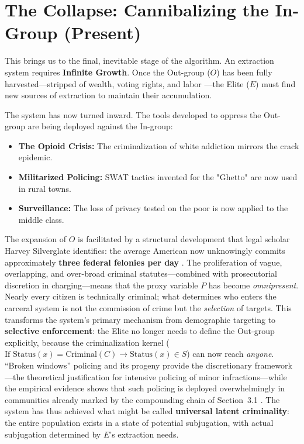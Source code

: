 \documentclass[12pt,openany]{book}
\begin{document}
\section{The Collapse: Cannibalizing the In-Group (Present)}
This brings us to the final, inevitable stage of the algorithm. An extraction system requires \textbf{Infinite Growth}. Once the Out-group ($O$) has been fully harvested---stripped of wealth, voting rights, and labor \cite{coates}---the Elite ($E$) must find new sources of extraction to maintain their accumulation.

The system has now turned inward. The tools developed to oppress the Out-group are being deployed against the In-group:
\begin{itemize}
    \item \textbf{The Opioid Crisis:} The criminalization of white addiction mirrors the crack epidemic.
    \item \textbf{Militarized Policing:} SWAT tactics invented for the "Ghetto" are now used in rural towns.
    \item \textbf{Surveillance:} The loss of privacy tested on the poor is now applied to the middle class.
\end{itemize}

The expansion of $O$ is facilitated by a structural development that legal scholar Harvey Silverglate identifies: the average American now unknowingly commits approximately \textbf{three federal felonies per day} \cite{silverglate}. The proliferation of vague, overlapping, and over-broad criminal statutes---combined with prosecutorial discretion in charging---means that the proxy variable $P$ has become \textit{omnipresent}. Nearly every citizen is technically criminal; what determines who enters the carceral system is not the commission of crime but the \textit{selection} of targets. This transforms the system's primary mechanism from demographic targeting to \textbf{selective enforcement}: the Elite no longer needs to define the Out-group explicitly, because the criminalization kernel ($\text{If } \text{Status}(x) = \text{Criminal}(C) \rightarrow \text{Status}(x) \in S$) can now reach \textit{anyone}. ``Broken windows'' policing \cite{wilson} and its progeny provide the discretionary framework---the theoretical justification for intensive policing of minor infractions---while the empirical evidence shows that such policing is deployed overwhelmingly in communities already marked by the compounding chain of Section~3.1 \cite{harcourt}. The system has thus achieved what might be called \textbf{universal latent criminality}: the entire population exists in a state of potential subjugation, with actual subjugation determined by $E$'s extraction needs.
\end{document}
